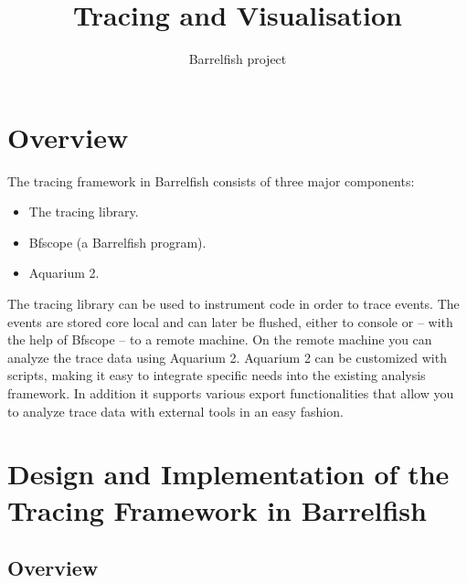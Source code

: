 \documentclass[a4paper,11pt,twoside]{report}
\title{Tracing and Visualisation}
\author{Barrelfish project}
\begin{document}
\maketitle			%

\begin{versionhistory}
\end{versionhistory}

\tableofcontents		%


\chapter{Overview}

The tracing framework in Barrelfish consists of three major components:

\begin{itemize}
	\item The tracing library.
	\item Bfscope (a Barrelfish program).
	\item Aquarium 2.
\end{itemize}

The tracing library can be used to instrument code in order to trace events.
The events are stored core local and can later be flushed, either to console
or -- with the help of Bfscope -- to a remote machine. On the remote machine
you can analyze the trace data using Aquarium 2. Aquarium 2 can be customized with scripts,
making it easy to integrate specific needs into the existing analysis framework.
In addition it supports various export functionalities that allow you to analyze
trace data with external tools in an easy fashion.

\chapter{Design and Implementation of the Tracing Framework in Barrelfish}

\section{Overview\label{sec:trace-overview}}
\end{document}
